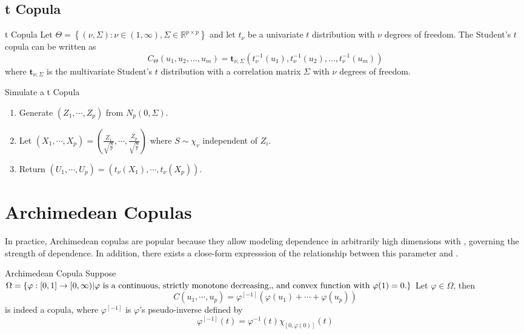 \documentclass[12pt]{article}
\begin{document}
\subsection{t Copula}
\begin{sdefinition}{t Copula}{}
	Let $\Theta=\left\{(\nu, \Sigma): \nu \in(1, \infty), \Sigma \in \mathbb{R}^{p \times p}\right\}$ and let $t_\nu$ be a univariate $t$ distribution with $\nu$ degrees of freedom.
The Student's $t$ copula can be written as
$$
C_{\Theta}\left(u_1, u_2, \ldots, u_m\right)=\boldsymbol{t}_{\nu, \Sigma}\left(t_\nu^{-1}\left(u_1\right), t_\nu^{-1}\left(u_2\right), \ldots, t_\nu^{-1}\left(u_m\right)\right)
$$
where $\boldsymbol{t}_{\nu, \Sigma}$ is the multivariate Student's $t$ distribution with a correlation matrix $\Sigma$ with $\nu$ degrees of freedom.
\end{sdefinition}

\begin{algorithm}{Simulate a t Copula}{}
\begin{enumerate}
	\item Generate $(Z_1,\cdots,Z_p)$ from $N_p(0,\Sigma)$.
	\item Let $(X_1,\cdots,X_p)=(\frac{Z_1}{\sqrt{\frac{S}{\nu}}},\cdots,\frac{Z_p}{\sqrt{\frac{S}{\nu}}})$ where $S\sim \chi_v$ independent of $Z_i$.
	\item Return $(U_1,\cdots,U_p)=(t_\nu(X_1),\cdots,t_\nu(X_p))$.
\end{enumerate}

\end{algorithm}






\section{Archimedean Copulas}
In practice, Archimedean copulas are popular because they allow modeling dependence in arbitrarily high dimensions with , governing the strength of dependence. In addition, there exists a close-form expresssion of the relationship between this parameter and .
\begin{sdefinition}{Archimedean Copula}{}
Suppose $\Omega = \{\varphi:[0,1] \to [0,\infty) | \text{$\varphi$ is a continuous,
strictly monotone decreasing,} \\ \text{, and convex function with $\varphi(1)=0$.} \}$ Let $\varphi \in \Omega$, then 
$$
C(u_1,\cdots,u_p) = \varphi^{[-1]}(\varphi(u_1)+\cdots+\varphi(u_p))
$$
is indeed a copula, where  $\varphi^{[-1]}$ is $\varphi$'s pseudo-inverse defined by
$$
\varphi^{[-1]}(t) = \varphi^{-1}(t) \chi_{[0,\varphi(0)]}(t)
$$
\end{sdefinition}
\end{document}
